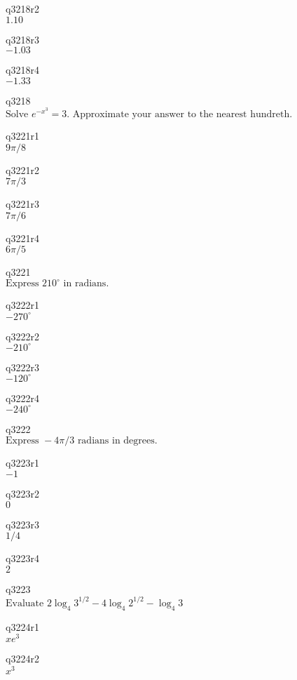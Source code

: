 q3218r2\\
\(\displaystyle 1.10 \)

q3218r3\\
\(\displaystyle -1.03 \)

q3218r4\\
\(\displaystyle -1.33 \)

q3218\\
\(\displaystyle \text{Solve } e^{-x^3} = 3. \text{ Approximate your answer to the nearest hundreth.} \)

q3221r1\\
\(\displaystyle 9\pi/8 \)

q3221r2\\
\(\displaystyle 7\pi/3 \)

q3221r3\\
\(\displaystyle 7\pi/6 \)

q3221r4\\
\(\displaystyle 6\pi/5 \)

q3221\\
\(\displaystyle \text{Express } 210^{\circ} \text{ in radians.} \)

q3222r1\\
\(\displaystyle -270^{\circ} \)

q3222r2\\
\(\displaystyle -210^{\circ} \)

q3222r3\\
\(\displaystyle -120^{\circ} \)

q3222r4\\
\(\displaystyle -240^{\circ} \)

q3222\\
\(\displaystyle \text{Express } -4\pi/3 \text{ radians in degrees.} \)

q3223r1\\
\(\displaystyle -1 \)

q3223r2\\
\(\displaystyle 0 \)

q3223r3\\
\(\displaystyle 1/4 \)

q3223r4\\
\(\displaystyle 2 \)

q3223\\
\(\displaystyle \text{Evaluate } 2\log_4 3^{1/2} - 4\log_4 2^{1/2} - \log_4 3 \)

q3224r1\\
\(\displaystyle xe^3 \)

q3224r2\\
\(\displaystyle x^3 \)

